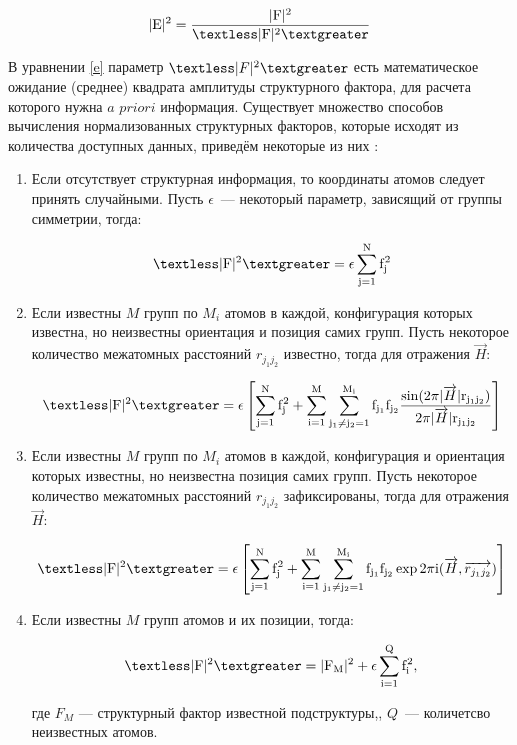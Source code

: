 \begin{equation}\label{e}
	\mathrm{|E|^2 = \frac{|F|^2}{\textless|F|^2\textgreater}}
\end{equation}


В уравнении \ref{e} параметр $\textless|F|^2\textgreater$ есть математическое ожидание (среднее) квадрата амплитуды структурного фактора, для расчета которого нужна $a$ $priori$ информация. Существует множество способов вычисления нормализованных структурных факторов, которые исходят из количества доступных данных, приведём некоторые из них \cite{giacovazzo_international_2010}:

\begin{enumerate}
	\item Если отсутствует структурная информация, то координаты атомов следует принять случайными. Пусть $\epsilon$~--- некоторый параметр, зависящий от группы симметрии, тогда:
	
	\begin{equation}\label{e1}
		\mathrm{\textless|F|^2\textgreater = \epsilon\sum\limits_{j=1}^N f_j^2}
	\end{equation}
	
	\item Если известны $M$ групп по $M_i$ атомов в каждой, конфигурация которых известна, но неизвестны ориентация и позиция самих групп. Пусть некоторое количество межатомных расстояний $r_{j_1j_2}$ известно, тогда для отражения $\overrightarrow{H}$:
	
	\begin{equation}\label{e2}
		\mathrm{\textless|F|^2\textgreater = \epsilon \left[\sum\limits_{j=1}^Nf_j^2 + \sum\limits_{i=1}^M\sum\limits_{j_1\neq j_2=1}^{M_i}f_{j_1}f_{j_2}\frac{\sin(2\pi |\overrightarrow{H}|r_{j_1j_2})}{2\pi |\overrightarrow{H}|r_{j_1j_2}}\right]}
	\end{equation}
	
	\item Если известны $M$ групп по $M_i$ атомов в каждой, конфигурация и ориентация которых известны, но неизвестна позиция самих групп. Пусть некоторое количество межатомных расстояний $r_{j_1j_2}$ зафиксированы, тогда для отражения $\overrightarrow{H}$:
	
	\begin{equation}\label{e3}
		\mathrm{\textless|F|^2\textgreater = \epsilon \left[\sum\limits_{j=1}^Nf_j^2 + \sum\limits_{i=1}^M\sum\limits_{j_1\neq j_2=1}^{M_i}f_{j_1}f_{j_2}\exp 2\pi i(\overrightarrow{H},\overrightarrow{r_{j_1j_2}})\right]}
	\end{equation}
	
	\item Если известны $M$ групп атомов и их позиции, тогда:
	
	\begin{equation}\label{e4}
		\mathrm{\textless|F|^2\textgreater = |F_M|^2 + \epsilon\sum\limits_{i=1}^Qf_i^2},
	\end{equation}
	
	где $F_M$ --- структурный фактор известной подструктуры,, $Q$~--- количетсво неизвестных атомов.
\end{enumerate}

